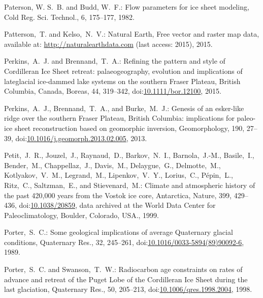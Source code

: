 \documentclass[tc, manuscript]{copernicus}
\begin{document}
\begin{thebibliography}{114}
Paterson, W. S.~B. and Budd, W.~F.: Flow parameters for ice sheet modeling, Cold Reg. Sci. Technol., 6, 175--177, 1982.


Patterson,~T. and Kelso,~N.~V.: {N}atural {E}arth, {F}ree vector and raster
map data, available at: \url{http://naturalearthdata.com} (last access:
2015), 2015.


Perkins,~A.~J. and Brennand,~T.~A.: Refining the pattern and style of Cordilleran Ice Sheet retreat: palaeogeography, evolution and implications of lateglacial ice-dammed lake systems on the southern Fraser Plateau, British Columbia, Canada, Boreas, 44, 319--342,
doi:\href{http://dx.doi.org/10.1111/bor.12100}{10.1111/bor.12100}, 2015.


Perkins,~A.~J., Brennand,~T.~A., and Burke,~M.~J.: Genesis of an esker-like ridge over the southern Fraser Plateau, British Columbia: implications for paleo-ice sheet reconstruction based on geomorphic inversion, Geomorphology, 190, 27--39,
doi:\href{http://dx.doi.org/10.1016/j.geomorph.2013.02.005}{10.1016/j.geomorph.2013.02.005}, 2013.


Petit,~J.~R., Jouzel,~J., Raynaud,~D., Barkov,~N.~I., Barnola,~J.-M., Basile,~I., Bender,~M., Chappellaz,~J., Davis,~M., Delaygue,~G., Delmotte,~M., Kotlyakov,~V.~M., Legrand,~M., Lipenkov,~V.~Y., Lorius,~C., P{\'e}pin,~L., Ritz,~C., Saltzman,~E., and Stievenard,~M.: Climate and atmospheric history of the past 420,000 years from the Vostok ice core, Antarctica, Nature, 399, 429--436,
doi:\href{http://dx.doi.org/10.1038/20859}{10.1038/20859}, data archived at the World Data Center for Paleoclimatology, Boulder, Colorado, USA., 1999.


Porter,~S.~C.: Some geological implications of average Quaternary glacial conditions, Quaternary Res., 32, 245--261,
doi:\href{http://dx.doi.org/10.1016/0033-5894(89)90092-6}{10.1016/0033-5894(89)90092-6}, 1989.


Porter,~S.~C. and Swanson,~T.~W.: Radiocarbon age constraints on rates of advance and retreat of the {P}uget {L}obe of the {C}ordilleran {I}ce {S}heet during the last glaciation, Quaternary Res., 50, 205--213,
doi:\href{http://dx.doi.org/10.1006/qres.1998.2004}{10.1006/qres.1998.2004}, 1998.



\end{thebibliography}
\end{document}
